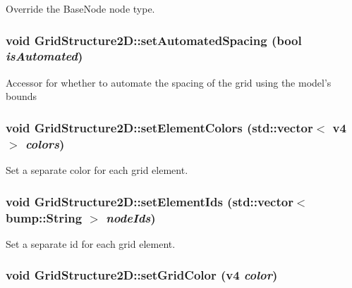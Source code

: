 \label{class_grid_structure2_d_af994372e96543559c040b40bb6969bfa}
Override the BaseNode node type. \hypertarget{class_grid_structure2_d_acbf816d7cb1750c2084c09db385f2db3}{
\subsubsection[{setAutomatedSpacing}]{\setlength{\rightskip}{0pt plus 5cm}void GridStructure2D::setAutomatedSpacing (bool {\em isAutomated})}}
\label{class_grid_structure2_d_acbf816d7cb1750c2084c09db385f2db3}
Accessor for whether to automate the spacing of the grid using the model's bounds \hypertarget{class_grid_structure2_d_a8e7ab4852eb1565ee2853e38d13fecd0}{
\subsubsection[{setElementColors}]{\setlength{\rightskip}{0pt plus 5cm}void GridStructure2D::setElementColors (std::vector$<$ v4 $>$ {\em colors})}}
\label{class_grid_structure2_d_a8e7ab4852eb1565ee2853e38d13fecd0}
Set a separate color for each grid element. \hypertarget{class_grid_structure2_d_a29faefdc28cc26500d55ee8b440d9e14}{
\subsubsection[{setElementIds}]{\setlength{\rightskip}{0pt plus 5cm}void GridStructure2D::setElementIds (std::vector$<$ bump::String $>$ {\em nodeIds})}}
\label{class_grid_structure2_d_a29faefdc28cc26500d55ee8b440d9e14}
Set a separate id for each grid element. \hypertarget{class_grid_structure2_d_a42560f8eba785035b818caa98ac0b638}{
\subsubsection[{setGridColor}]{\setlength{\rightskip}{0pt plus 5cm}void GridStructure2D::setGridColor (v4 {\em color})}}
\label{class_grid_structure2_d_a42560f8eba785035b818caa98ac0b638}
